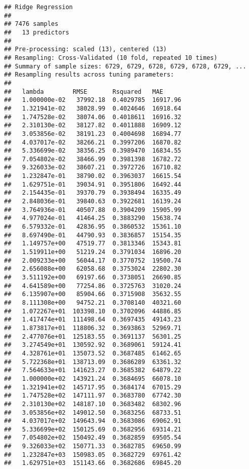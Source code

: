 \documentclass[]{article}
\begin{document}
\begin{verbatim}
## Ridge Regression 
## 
## 7476 samples
##   13 predictors
## 
## Pre-processing: scaled (13), centered (13) 
## Resampling: Cross-Validated (10 fold, repeated 10 times) 
## Summary of sample sizes: 6729, 6729, 6728, 6729, 6728, 6729, ... 
## Resampling results across tuning parameters:
## 
##   lambda        RMSE       Rsquared   MAE     
##   1.000000e-02   37992.18  0.4029785  16917.96
##   1.321941e-02   38028.99  0.4024646  16918.64
##   1.747528e-02   38074.06  0.4018611  16916.32
##   2.310130e-02   38127.82  0.4011888  16909.12
##   3.053856e-02   38191.23  0.4004698  16894.77
##   4.037017e-02   38266.21  0.3997206  16870.82
##   5.336699e-02   38356.25  0.3989470  16834.55
##   7.054802e-02   38466.99  0.3981398  16782.72
##   9.326033e-02   38607.21  0.3972726  16710.82
##   1.232847e-01   38790.02  0.3963037  16615.54
##   1.629751e-01   39034.91  0.3951806  16492.44
##   2.154435e-01   39370.79  0.3938494  16335.49
##   2.848036e-01   39840.63  0.3922681  16139.24
##   3.764936e-01   40507.88  0.3904209  15905.99
##   4.977024e-01   41464.25  0.3883290  15638.74
##   6.579332e-01   42836.95  0.3860532  15361.10
##   8.697490e-01   44790.93  0.3836857  15154.35
##   1.149757e+00   47519.77  0.3813346  15343.81
##   1.519911e+00   51219.24  0.3791034  16896.20
##   2.009233e+00   56044.17  0.3770752  19500.74
##   2.656088e+00   62058.68  0.3753024  22802.30
##   3.511192e+00   69197.66  0.3738051  26690.85
##   4.641589e+00   77254.86  0.3725763  31020.24
##   6.135907e+00   85904.66  0.3715908  35632.55
##   8.111308e+00   94752.21  0.3708140  40321.60
##   1.072267e+01  103398.10  0.3702096  44886.85
##   1.417474e+01  111498.64  0.3697435  49143.23
##   1.873817e+01  118806.32  0.3693863  52969.71
##   2.477076e+01  125183.55  0.3691137  56301.25
##   3.274549e+01  130592.92  0.3689061  59124.41
##   4.328761e+01  135073.52  0.3687485  61462.65
##   5.722368e+01  138713.09  0.3686289  63361.32
##   7.564633e+01  141623.27  0.3685382  64879.22
##   1.000000e+02  143921.24  0.3684695  66078.10
##   1.321941e+02  145717.95  0.3684174  67015.29
##   1.747528e+02  147111.97  0.3683780  67742.30
##   2.310130e+02  148187.10  0.3683482  68302.96
##   3.053856e+02  149012.50  0.3683256  68733.51
##   4.037017e+02  149643.94  0.3683086  69062.91
##   5.336699e+02  150125.69  0.3682956  69314.21
##   7.054802e+02  150492.49  0.3682859  69505.54
##   9.326033e+02  150771.33  0.3682785  69650.99
##   1.232847e+03  150983.05  0.3682729  69761.42
##   1.629751e+03  151143.66  0.3682686  69845.20

\end{verbatim}
\end{document}
